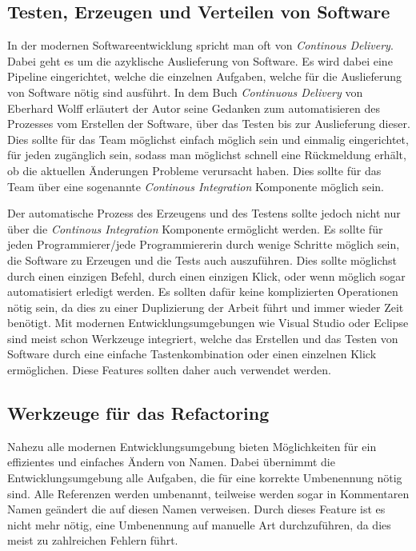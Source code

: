 \subsection{Testen, Erzeugen und Verteilen von Software}
In der modernen Softwareentwicklung spricht man oft von \textit{Continous Delivery}. Dabei geht es um die azyklische Auslieferung von Software. Es wird dabei eine Pipeline eingerichtet, welche die einzelnen Aufgaben, welche für die Auslieferung von Software nötig sind ausführt. In dem Buch \textit{Continuous Delivery} von Eberhard Wolff erläutert der Autor seine Gedanken zum automatisieren des Prozesses vom Erstellen der Software, über das Testen bis zur Auslieferung dieser. Dies sollte für das Team möglichst einfach möglich sein und einmalig eingerichtet, für jeden zugänglich sein, sodass man möglichst schnell eine Rückmeldung erhält, ob die aktuellen Änderungen Probleme verursacht haben. Dies sollte für das Team über eine sogenannte \textit{Continous Integration} Komponente möglich sein.

\SuperPar Der automatische Prozess des Erzeugens und des Testens sollte jedoch nicht nur über die \textit{Continous Integration} Komponente ermöglicht werden. Es sollte für jeden Programmierer/jede Programmiererin durch wenige Schritte möglich sein, die Software zu Erzeugen und die Tests auch auszuführen. Dies sollte möglichst durch einen einzigen Befehl, durch einen einzigen Klick, oder wenn möglich sogar automatisiert erledigt werden. Es sollten dafür keine komplizierten Operationen nötig sein, da dies zu einer Duplizierung der Arbeit führt und immer wieder Zeit benötigt. Mit modernen Entwicklungsumgebungen wie Visual Studio oder Eclipse sind meist schon Werkzeuge integriert, welche das Erstellen und das Testen von Software durch eine einfache Tastenkombination oder einen einzelnen Klick ermöglichen. Diese Features sollten daher auch verwendet werden.

\subsection{Werkzeuge für das Refactoring}
Nahezu alle modernen Entwicklungsumgebung bieten Möglichkeiten für ein effizientes und einfaches Ändern von Namen. Dabei übernimmt die Entwicklungsumgebung alle Aufgaben, die für eine korrekte Umbenennung nötig sind. Alle Referenzen werden umbenannt, teilweise werden sogar in Kommentaren Namen geändert die auf diesen Namen verweisen. Durch dieses Feature ist es nicht mehr nötig, eine Umbenennung auf manuelle Art durchzuführen, da dies meist zu zahlreichen Fehlern führt. 


